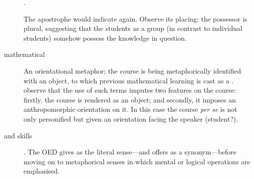 \begin{description}
  .
\item[\metaphor{students'}]\qquad The apostrophe would indicate
   again.  Observe its placing: the
  possessor is plural, suggesting that the students as a group (in
  contrast to individual students) somehow possess the knowledge in
  question.
\item[mathematical \metaphor{background}]\qquad An orientational
  metaphor; the course is being metaphorically identified with an
  object, to which previous mathematical learning is cast as a
  .  observe that the use of
  such terms imputes two features on the course: firstly, the course
  is rendered as an object; and secondly, it imposes an
  anthropomorphic orientation on it.  In this case the course
  \emph{per se} is not only personified but given an orientation
  facing the speaker (student?).
\item[and \metaphor{manipulative} skills]\qquad{}.  The OED gives  as the literal sense---and offers
   as a synonym---before moving on to metaphorical
  senses in which mental or logical operations are emphasised.


\end{description}
